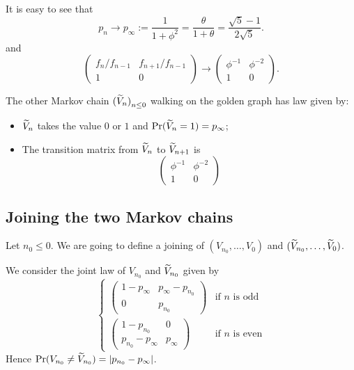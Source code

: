 \documentclass[12pt,a4paper]{article}
\begin{document}
It is easy to see that 
$$
p_n \to p_\infty := \frac{1}{1+\phi^2}= \frac{\theta}{1+\theta} = \frac{\sqrt{5}-1}{2\sqrt{5}}.
$$
and 
$$
\begin{pmatrix}
f_n/f_{n-1} & f_{n+1}/f_{n-1} \\
1 & 0
\end{pmatrix} 
\to \begin{pmatrix}
\phi^{-1} & \phi^{-2} \\
1 & 0
\end{pmatrix}. 
$$

The other Markov chain ${(\widetilde{V}_n)}_{n \leq 0}$ walking on the golden graph has law given by:

\begin{itemize}
\item $\widetilde{V}_n$ takes the value $0$ or $1$ and $\Pr(\widetilde{V}_n=1) = p_\infty$;

\item The transition matrix from $\widetilde{V}_{n}$ to $\widetilde{V}_{n+1}$ is 
$$
\begin{pmatrix}
\phi^{-1} & \phi^{-2} \\
1 & 0
\end{pmatrix}
$$
\end{itemize}


\subsection{Joining the two Markov chains}\label{sec:joiningVn}


Let $n_0 \leq 0$. We are going to define a joining of $(V_{n_0}, \ldots, V_0)$ and 
$(\widetilde{V}_{n_0}, \ldots, \widetilde{V}_0)$.

We consider the joint law of $V_{n_0}$ and $\widetilde{V}_{n_0}$ given by
$$
\begin{cases}
\begin{pmatrix} 
1-p_\infty &  p_\infty - p_{n_0} \\
0 & p_{n_0}
\end{pmatrix} & \text{if $n$ is odd} \\
\begin{pmatrix} 
1-p_{n_0}  &  0 \\
p_{n_0} - p_\infty  & p_\infty
\end{pmatrix} & \text{if $n$ is even}
\end{cases}
$$
Hence $\Pr(V_{n_0} \neq \widetilde{V}_{n_0}) = |p_{n_0}-p_\infty|$.
\end{document}
